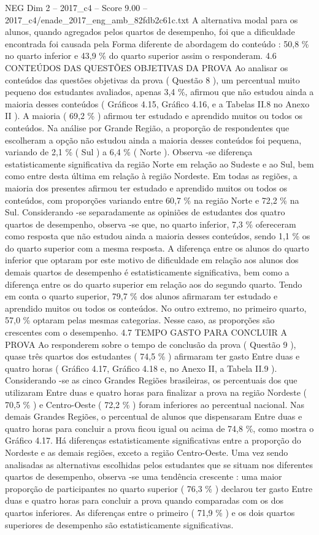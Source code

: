 \begin{textsample}{NEG Dim 2 – 2017\_c4 – Score 9.00 – 2017\_c4/enade\_2017\_eng\_amb\_82fdb2c61c.txt}
A alternativa modal para os alunos, quando agregados pelos quartos de desempenho, foi que a dificuldade encontrada foi causada pela Forma diferente de abordagem do conteúdo : 50,8 \% no quarto inferior e 43,9 \% do quarto superior assim o responderam. 4.6 CONTEÚDOS DAS QUESTÕES OBJETIVAS DA PROVA Ao analisar os conteúdos das questões objetivas da prova ( Questão 8 ), um percentual muito pequeno dos estudantes avaliados, apenas 3,4 \%, afirmou que não estudou ainda a maioria desses conteúdos ( Gráficos 4.15, Gráfico 4.16, e a Tabelas II.8 no Anexo II ).
A maioria ( 69,2 \% ) afirmou ter estudado e aprendido muitos ou todos os conteúdos.
Na análise por Grande Região, a proporção de respondentes que escolheram a opção não estudou ainda a maioria desses conteúdos foi pequena, variando de 2,1 \% ( Sul ) a 6,4 \% ( Norte ).
Observa -se diferença estatisticamente significativa da região Norte em relação ao Sudeste e ao Sul, bem como entre desta última em relação à região Nordeste.
Em todas as regiões, a maioria dos presentes afirmou ter estudado e aprendido muitos ou todos os conteúdos, com proporções variando entre 60,7 \% na região Norte e 72,2 \% na Sul.
Considerando -se separadamente as opiniões de estudantes dos quatro quartos de desempenho, observa -se que, no quarto inferior, 7,3 \% ofereceram como resposta que não estudou ainda a maioria desses conteúdos, sendo 1,1 \% os do quarto superior com a mesma resposta.
A diferença entre os alunos do quarto inferior que optaram por este motivo de dificuldade em relação aos alunos dos demais quartos de desempenho é estatisticamente significativa, bem como a diferença entre os do quarto superior em relação aos do segundo quarto.
Tendo em conta o quarto superior, 79,7 \% dos alunos afirmaram ter estudado e aprendido muitos ou todos os conteúdos.
No outro extremo, no primeiro quarto, 57,0 \% optaram pelas mesmas categorias.
Nesse caso, as proporções são crescentes com o desempenho. 4.7 TEMPO GASTO PARA CONCLUIR A PROVA Ao responderem sobre o tempo de conclusão da prova ( Questão 9 ), quase três quartos dos estudantes ( 74,5 \% ) afirmaram ter gasto Entre duas e quatro horas ( Gráfico 4.17, Gráfico 4.18 e, no Anexo II, a Tabela II.9 ).
Considerando -se as cinco Grandes Regiões brasileiras, os percentuais dos que utilizaram Entre duas e quatro horas para finalizar a prova na região Nordeste ( 70,5 \% ) e Centro-Oeste ( 72,2 \% ) foram inferiores ao percentual nacional.
Nas demais Grandes Regiões, o percentual de alunos que dispensaram Entre duas e quatro horas para concluir a prova ficou igual ou acima de 74,8 \%, como mostra o Gráfico 4.17.
Há diferenças estatisticamente significativas entre a proporção do Nordeste e as demais regiões, exceto a região Centro-Oeste.
Uma vez sendo analisadas as alternativas escolhidas pelos estudantes que se situam nos diferentes quartos de desempenho, observa -se uma tendência crescente : uma maior proporção de participantes no quarto superior ( 76,3 \% ) declarou ter gasto Entre duas e quatro horas para concluir a prova quando comparadas com os dos quartos inferiores.
As diferenças entre o primeiro ( 71,9 \% ) e os dois quartos superiores de desempenho são estatisticamente significativas.

\end{textsample}
